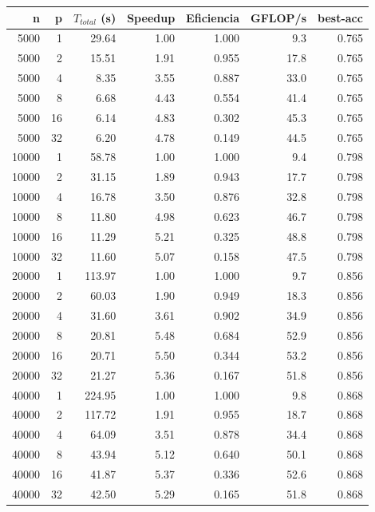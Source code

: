 \begin{tabular}{rrrrrrr}
\hline
n & p & $T_{total}$ (s) & Speedup & Eficiencia & GFLOP/s & best-acc \\
\hline
5000 & 1 & 29.64 & 1.00 & 1.000 & 9.3 & 0.765 \\
5000 & 2 & 15.51 & 1.91 & 0.955 & 17.8 & 0.765 \\
5000 & 4 & 8.35 & 3.55 & 0.887 & 33.0 & 0.765 \\
5000 & 8 & 6.68 & 4.43 & 0.554 & 41.4 & 0.765 \\
5000 & 16 & 6.14 & 4.83 & 0.302 & 45.3 & 0.765 \\
5000 & 32 & 6.20 & 4.78 & 0.149 & 44.5 & 0.765 \\
10000 & 1 & 58.78 & 1.00 & 1.000 & 9.4 & 0.798 \\
10000 & 2 & 31.15 & 1.89 & 0.943 & 17.7 & 0.798 \\
10000 & 4 & 16.78 & 3.50 & 0.876 & 32.8 & 0.798 \\
10000 & 8 & 11.80 & 4.98 & 0.623 & 46.7 & 0.798 \\
10000 & 16 & 11.29 & 5.21 & 0.325 & 48.8 & 0.798 \\
10000 & 32 & 11.60 & 5.07 & 0.158 & 47.5 & 0.798 \\
20000 & 1 & 113.97 & 1.00 & 1.000 & 9.7 & 0.856 \\
20000 & 2 & 60.03 & 1.90 & 0.949 & 18.3 & 0.856 \\
20000 & 4 & 31.60 & 3.61 & 0.902 & 34.9 & 0.856 \\
20000 & 8 & 20.81 & 5.48 & 0.684 & 52.9 & 0.856 \\
20000 & 16 & 20.71 & 5.50 & 0.344 & 53.2 & 0.856 \\
20000 & 32 & 21.27 & 5.36 & 0.167 & 51.8 & 0.856 \\
40000 & 1 & 224.95 & 1.00 & 1.000 & 9.8 & 0.868 \\
40000 & 2 & 117.72 & 1.91 & 0.955 & 18.7 & 0.868 \\
40000 & 4 & 64.09 & 3.51 & 0.878 & 34.4 & 0.868 \\
40000 & 8 & 43.94 & 5.12 & 0.640 & 50.1 & 0.868 \\
40000 & 16 & 41.87 & 5.37 & 0.336 & 52.6 & 0.868 \\
40000 & 32 & 42.50 & 5.29 & 0.165 & 51.8 & 0.868 \\
\hline
\end{tabular}
